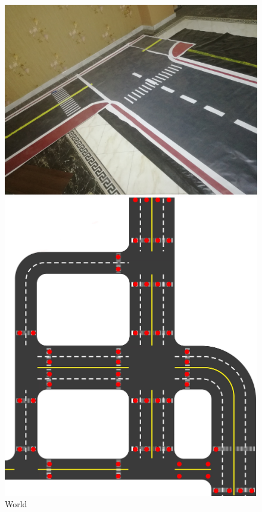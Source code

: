 \begin{figure}%
\center
    \begin{minipage}[t]{0.3\linewidth}
	\includegraphics[width=\textwidth]{images/Learningprocess/world2.jpg}
     \end{minipage}
	\begin{minipage}[t]{0.3\linewidth}
	\includegraphics[width=\textwidth]{images/motion/map.jpg}
	\end{minipage}
    \caption[World]{World}\label{fig: World}%
  \end{figure}


